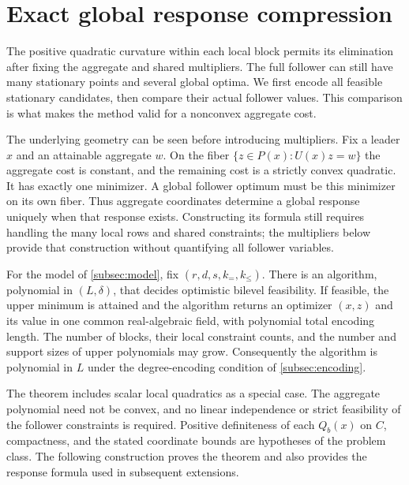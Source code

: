 \section{Exact global response compression}\label{sec:exact}

The positive quadratic curvature within each local block permits its
elimination after fixing the aggregate and shared multipliers. The full
follower can still have many stationary points and several global optima.
We first encode all feasible stationary candidates, then compare their
actual follower values. This comparison is what makes the method valid
for a nonconvex aggregate cost.

The underlying geometry can be seen before introducing multipliers.
Fix a leader $x$ and an attainable aggregate $w$. On the fiber
$\{z\in P(x):U(x)z=w\}$ the aggregate cost is constant, and the
remaining cost is a strictly convex quadratic. It has exactly one
minimizer. A global follower optimum must be this minimizer on its own
fiber. Thus aggregate coordinates determine a global response uniquely
when that response exists. Constructing its formula still requires
handling the many local rows and shared constraints; the multipliers
below provide that construction without quantifying all follower variables.

\begin{theorem}\label{thm:exact-block}
For the model of \cref{subsec:model}, fix
$(r,d,s,k_=,k_{\le})$. There is an algorithm, polynomial in $(L,\delta)$,
that decides optimistic bilevel feasibility. If feasible, the upper
minimum is attained and the algorithm returns an optimizer $(x,z)$ and
its value in one common real-algebraic field, with polynomial total
encoding length. The number of blocks, their local constraint counts,
and the number and support sizes of upper polynomials may grow.
Consequently the algorithm is polynomial in $L$ under the degree-encoding
condition of \cref{subsec:encoding}.
\end{theorem}

The theorem includes scalar local quadratics as a special case. The
aggregate polynomial need not be convex, and no linear independence or strict
feasibility of the follower constraints is required. Positive definiteness
of each $Q_b(x)$ on $C$, compactness, and the stated coordinate bounds
are hypotheses of the problem class. The following construction proves
the theorem and also provides the response formula used in subsequent
extensions.

